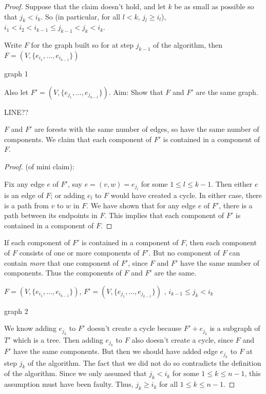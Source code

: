 \documentclass{article}
\begin{document}
\begin{proof}
Suppose that the claim doesn't hold, and let $k$ be as small as possible so that $j_k < i_k$.  So (in particular, for all $l <k$, $j_l \ge i_l$), $i _1 < i_2 < i_{k-1} \le j_{k-1} < j_k <i_k$.

Write $F$ for the graph built so for at step $j_{k-1}$ of the algorithm, then $F=(V, \{e_{i_1}, \ldots, e_{i_{k-1}}  \})$

graph 1

Also let $F'= (V, \{e_{j_1}, \ldots, e_{j_{k-1}} \})$.  Aim: Show that $F$ and $F'$ are the same graph.

LINE??

$F$ and $F'$ are forests with the same number of edges, so have the same number of components.  We claim that each component of $F'$ is contained in a component of $F$.

\begin{proof} (of mini claim):

Fix any edge $e$ of $F'$, say $e= (v,w) = e_{j_l}$ for some $1 \le l \le k-1$.  Then either $e$ is an edge of $F$; or adding $e_l$ to $F$ would have created a cycle.  In either case, there is a path from $v$ to $w$ in $F$.  We have shown that for any edge $e$ of $F'$, there is a path between its endpoints in $F$.  This implies that each component of $F'$ is contained in a component of $F$.
\end{proof}

If each component of $F'$ is contained in a component of $F$, then each component of $F$ consists of one or more components of $F'$.  But no component of $F$ can contain \emph{more} that one component of $F'$, since $F$ and $F'$ have the same number of components.  Thus the components of $F$ and $F'$ are the same.

$F= (V, \{ e_{i_1}, \ldots, e_{i_{k-1}} \})$, $F'= (V, \{ e_{j_1}, \ldots, e_{j_{k-1}} \})$ , $i_{k-1} \le j_k < i_k$

graph 2

We know adding $e_{j_k}$ to $F'$ doesn't create a cycle because $F' + e_{j_k} $ is a subgraph of $T'$ which is a tree. Then adding $e_{j_k}$ to $F$ also doesn't create a cycle, since $F$ and $F'$ have the same components.  But then we should have added edge $e_{j_k}$ to $F$ at step $j_k$ of the algorithm.  The fact that we did not do so contradicts the definition of the algorithm.  Since we only assumed that $j_k <i_k$ for some $1 \le k \le n-1$, this assumption must have been faulty.  Thus, $j_k \ge i_k$ for all $1 \le k \le n-1$.
\end{proof}
\end{document}
